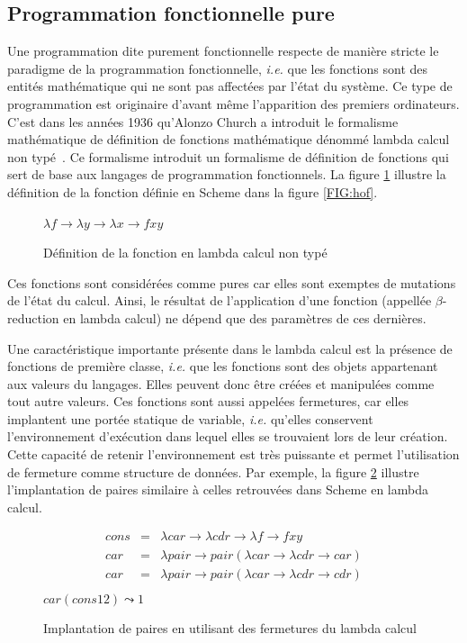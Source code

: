 \documentclass[12pt,oneside,letterpaper,francais]{book}
\newcommand{\ie}{{\textit{i.e. }}}
\newcommand{\scheme}[1]{\selectlanguage{english}{\tt #1}\selectlanguage{french}}
\begin{document}
\subsection{Programmation fonctionnelle pure}

Une programmation dite purement fonctionnelle respecte de manière
stricte le paradigme de la programmation fonctionnelle, \ie que les
fonctions sont des entités mathématique qui ne sont pas affectées par
l'état du système. Ce type de programmation est originaire d'avant
même l'apparition des premiers ordinateurs. C'est dans les années 1936
qu'Alonzo Church a introduit le formalisme mathématique de définition
de fonctions mathématique dénommé lambda calcul non
typé~\cite{LAMBDA_CALCULUS}. Ce formalisme introduit un formalisme de
définition de fonctions qui sert de base aux langages de programmation
fonctionnels. La figure \ref{FIG:lambda-calcul} illustre la définition
de la fonction \scheme{flip} définie en Scheme dans la figure
\ref{FIG:hof}.

\begin{figure}[htb!]
  \center
  $\lambda f \rightarrow \lambda y \rightarrow \lambda x \rightarrow f x y$
  \caption{Définition de la fonction \scheme{flip} en lambda calcul
    non typé}
  \label{FIG:lambda-calcul}
\end{figure}

Ces fonctions sont considérées comme pures car elles sont exemptes de
mutations de l'état du calcul. Ainsi, le résultat de l'application
d'une fonction (appellée $\beta$-reduction en lambda calcul) ne dépend
que des paramètres de ces dernières.

Une caractéristique importante présente dans le lambda calcul est la
présence de fonctions de première classe, \ie que les fonctions sont
des objets appartenant aux valeurs du langages. Elles peuvent donc
être créées et manipulées comme tout autre valeurs. Ces fonctions sont
aussi appelées fermetures, car elles implantent une portée statique de
variable, \ie qu'elles conservent l'environnement d'exécution dans
lequel elles se trouvaient lors de leur création. Cette capacité de
retenir l'environnement est très puissante et permet l'utilisation de
fermeture comme structure de données. Par exemple, la figure
\ref{Scheme:lambda-pairs} illustre l'implantation de paires similaire
à celles retrouvées dans Scheme en lambda calcul.

\begin{figure}[htb]
  \center
  \begin{eqnarray*}
   cons &=& \lambda car \rightarrow \lambda cdr \rightarrow \lambda f \rightarrow f x y \\
   car &=& \lambda pair \rightarrow pair (\lambda car \rightarrow \lambda cdr \rightarrow car) \\
   car &=& \lambda pair \rightarrow pair (\lambda car \rightarrow \lambda cdr \rightarrow cdr) \\
  \end{eqnarray*}
  $car (cons 1 2) \leadsto 1$
  \caption{Implantation de paires en utilisant des fermetures du
    lambda calcul}
  \label{Scheme:lambda-pairs}
\end{figure}
\end{document}
